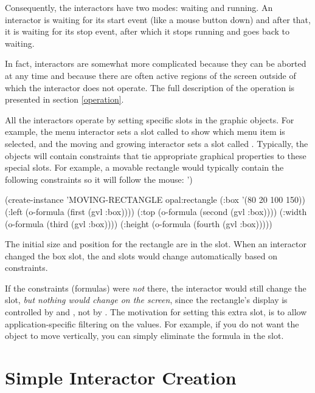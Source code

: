 Consequently, the interactors have two modes: waiting and running.  An
interactor is waiting for its start event (like a mouse button down) and
after that, it is waiting for its stop event, after which it
stops running and goes back to waiting.

In fact, interactors are somewhat more complicated because they can be
aborted at any time and because there are often active regions of the
screen outside of which the interactor does not operate.  The full
description of the operation is presented in section \ref{operation}.

All the interactors operate by setting specific slots in the graphic
objects.
For example, the menu interactor sets a slot called  to show
which menu item is selected, and the moving and growing interactor sets a
slot called .  Typically, the objects will contain constraints
that tie appropriate graphical properties to these special slots.  For
example, a movable rectangle would typically contain the following
constraints so it will follow the mouse:
')
\begin{programexample}
(create-instance 'MOVING-RECTANGLE opal:rectangle
   (:box '(80 20 100 150))
   (:left (o-formula (first (gvl :box))))
   (:top (o-formula (second (gvl :box))))
   (:width (o-formula (third (gvl :box))))
   (:height (o-formula (fourth (gvl :box)))))
\end{programexample}
The initial size and position for the rectangle are in the  slot.
When an interactor changed the box slot, the  and
 slots would change automatically based on constraints.

If the
constraints (formulas) were {\it not} there, the interactor would still
change the  slot, {\it but nothing would change on the screen},
since the rectangle's display is controlled by  and
, not by .
The motivation for setting this extra slot, is to allow application-specific
filtering on the values.  For example, if you do not want the object to
move vertically, you can simply eliminate the formula in the  slot.

\section{Simple Interactor Creation}

